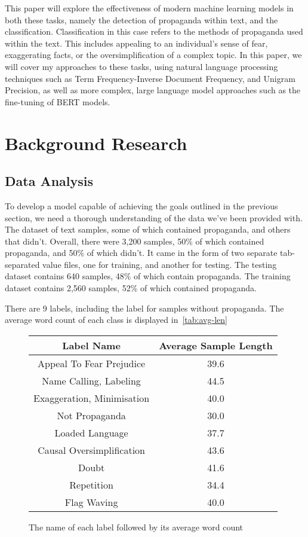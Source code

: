 \documentclass[twocolumn]{article}
\begin{document}
This paper will explore the effectiveness of modern machine learning models in both these tasks, namely the detection of propaganda within text, and the classification. Classification in this case refers to the methods of propaganda used within the text. This includes appealing to an individual's sense of fear, exaggerating facts, or the oversimplification of a complex topic. In this paper, we will cover my approaches to these tasks, using natural language processing techniques such as Term Frequency-Inverse Document Frequency, and Unigram Precision, as well as more complex, large language model approaches such as the fine-tuning of BERT models. 

\section{Background Research}

\subsection{Data Analysis}

To develop a model capable of achieving the goals outlined in the previous section, we need a thorough understanding of the data we've been provided with. The dataset of text samples, some of which contained propaganda, and others that didn't. Overall, there were 3,200 samples, 50\% of which contained propaganda, and 50\% of which didn't. It came in the form of two separate tab-separated value files, one for training, and another for testing. The testing dataset contains 640 samples, 48\% of which contain propaganda. The training dataset contains 2,560 samples, 52\% of which contained propaganda. 

There are 9 labels, including the label for samples without propaganda. The average word count of each class is displayed in~\autoref{tab:avg-len}


\begin{figure}
    \centering
    \begin{tabular}[pos]{ c c }
        \toprule
        \textbf{Label Name} & \textbf{Average Sample Length} \\ 
        \midrule
        Appeal To Fear Prejudice & 39.6 \\
        Name Calling, Labeling & 44.5 \\
        Exaggeration, Minimisation & 40.0 \\
        Not Propaganda & 30.0 \\
        Loaded Language & 37.7 \\
        Causal Oversimplification & 43.6 \\
        Doubt & 41.6 \\
        Repetition & 34.4 \\
        Flag Waving & 40.0 \\
        \bottomrule
    \end{tabular}
    \caption{The name of each label followed by its average word count}
    \label{tab:avg-len}
\end{figure}
\end{document}
